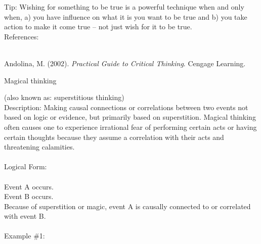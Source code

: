 \documentclass[a4paper,12pt,single,pdftex]{scrbook}
\begin{document}
{    
      Tip: Wishing for something to be true is a powerful technique when and only when, a) you have influence on what it is you want to be true and b) you take action to make it come true -- not just wish for it to be true.
    \\

    References:

    
      
        
      \\

      
        
          Andolina, M. (2002). {\it Practical Guide to Critical Thinking}. Cengage Learning.
        
      
    
  }


Magical thinking
    
      (also known as: superstitious thinking)
    \\

  
    
      Description: Making causal connections or correlations between two events not based on logic or evidence, but primarily based on superstition.  Magical thinking often causes one to experience irrational fear of performing certain acts or having certain thoughts because they assume a correlation with their acts and threatening calamities.
    \\

    
      
    \\

    
      Logical Form:
    \\

    
      
    \\

    
      Event A occurs.
    \\

    
      Event B occurs.
    \\

    
      Because of superstition or magic, event A is causally connected to or correlated with event B.
    \\

    
      
    \\

    
      Example \#1:
    \\

    
      
\end{document}
